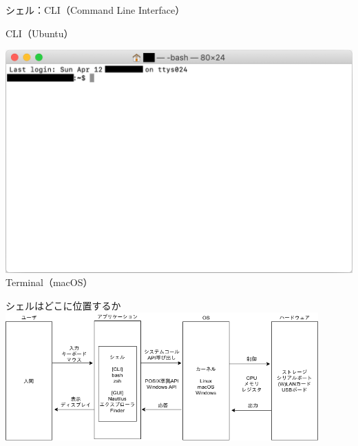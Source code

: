 \documentclass[12pt,aspectratio=169]{beamer}
\begin{document}
\begin{frame}{シェル：CLI（Command Line Interface）}
\begin{minipage}{0.3\textwidth}
    CLI（Ubuntu）
  \end{minipage}
  \hfill
  \begin{minipage}{0.3\textwidth}
    \vspace{-5\baselineskip}
    \includegraphics[width=2.0\linewidth,bb=0 0 1144 735]{./images/mac-basic.png}
    Terminal（macOS）
  \end{minipage}

\end{frame}

\begin{frame}{シェルはどこに位置するか}
  \centering
  \includegraphics[width=12cm,bb=0 0 741 281]{./images/shell.png}

\end{frame}
\end{document}
